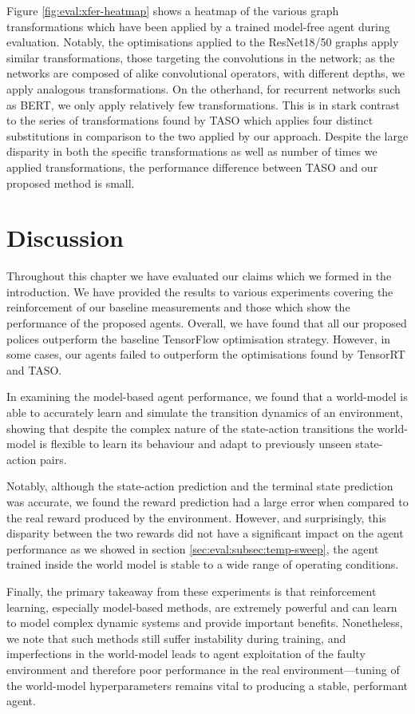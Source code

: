 Figure \ref{fig:eval:xfer-heatmap} shows a heatmap of the various graph transformations which have been applied by a trained model-free agent during evaluation. Notably, the optimisations applied to the ResNet18/50 graphs apply similar transformations, those targeting the convolutions in the network; as the networks are composed of alike convolutional operators, with different depths, we apply analogous transformations. On the otherhand, for recurrent networks such as BERT, we only apply relatively few transformations. This is in stark contrast to the series of transformations found by TASO which applies four distinct substitutions in comparison to the two applied by our approach. Despite the large disparity in both the specific transformations as well as number of times we applied transformations, the performance difference between TASO and our proposed method is small.

\section{Discussion}
Throughout this chapter we have evaluated our claims which we formed in the introduction. We have provided the results to various experiments covering the reinforcement of our baseline measurements and those which show the performance of the proposed agents. Overall, we have found that all our proposed polices outperform the baseline TensorFlow optimisation strategy. However, in some cases, our agents failed to outperform the optimisations found by TensorRT and TASO.

In examining the model-based agent performance, we found that a world-model is able to accurately learn and simulate the transition dynamics of an environment, showing that despite the complex nature of the state-action transitions the world-model is flexible to learn its behaviour and adapt to previously unseen state-action pairs. 

Notably, although the state-action prediction and the terminal state prediction was accurate, we found the reward prediction had a large error when compared to the real reward produced by the environment. However, and surprisingly, this disparity between the two rewards did not have a significant impact on the agent performance as we showed in section \ref{sec:eval:subsec:temp-sweep}, the agent trained inside the world model is stable to a wide range of operating conditions.

Finally, the primary takeaway from these experiments is that reinforcement learning, especially model-based methods, are extremely powerful and can learn to model complex dynamic systems and provide important benefits. Nonetheless, we note that such methods still suffer instability during training, and imperfections in the world-model leads to agent exploitation of the faulty environment and therefore poor performance in the real environment---tuning of the world-model hyperparameters remains vital to producing a stable, performant agent. 



